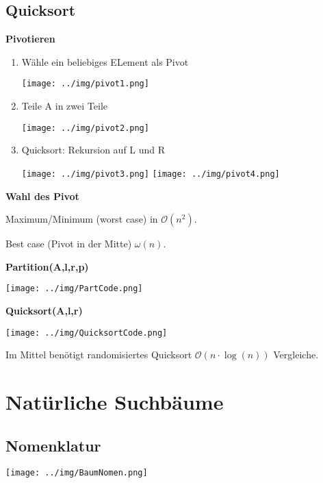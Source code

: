 \documentclass[german]{latex4ei/latex4ei_sheet}
\begin{document}
\begin{sectionbox}
\subsection{Quicksort}\smallskip
\textbf{Pivotieren}\par
\begin{enumerate}
    \item Wähle ein beliebiges ELement als Pivot\par
    \texttt{[image: ../img/pivot1.png]}
    \item Teile A in zwei Teile\par
    \texttt{[image: ../img/pivot2.png]}
    \item Quicksort: Rekursion auf L und R\par
    \texttt{[image: ../img/pivot3.png]}
    \texttt{[image: ../img/pivot4.png]}
\end{enumerate}\smallskip
\textbf{Wahl des Pivot}\par
Maximum/Minimum (worst case) in $\mathcal{O}(n^{2})$.\par
Best case (Pivot in der Mitte) $\omega(n)$.\par\smallskip
\textbf{Partition(A,l,r,p)}\par
\texttt{[image: ../img/PartCode.png]}
\par\smallskip

\textbf{Quicksort(A,l,r)}\par
\texttt{[image: ../img/QuicksortCode.png]}
\par\smallskip
\begin{greenbox}
Im Mittel benötigt randomisiertes Quicksort $\mathcal{O}(n \cdot \operatorname{log}(n))$ Vergleiche.
\end{greenbox}
\end{sectionbox}

\vspace{36px}

\section{Natürliche Suchbäume}

\begin{sectionbox}
\subsection{Nomenklatur}
\begin{center}
    \texttt{[image: ../img/BaumNomen.png]}
\end{center}
\end{sectionbox}
\end{document}
